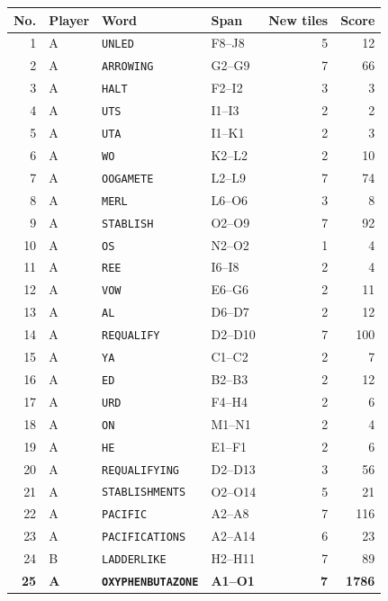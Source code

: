 \documentclass[letterpaper]{article}
\begin{document}
\begin{center}
\fontsize{8}{8.15}\selectfont
\setlength{\tabcolsep}{4pt}
\renewcommand{\arraystretch}{0.80}
\begin{tabular}{@{}rlllrr@{}}\toprule
No. & Player & Word & Span & New tiles & Score\\
\midrule
1 & A & \texttt{UNLED} & F8--J8 & 5 & 12\\
2 & A & \texttt{ARROWING} & G2--G9 & 7 & 66\\
3 & A & \texttt{HALT} & F2--I2 & 3 & 3\\
4 & A & \texttt{UTS} & I1--I3 & 2 & 2\\
5 & A & \texttt{UTA} & I1--K1 & 2 & 3\\
6 & A & \texttt{WO} & K2--L2 & 2 & 10\\
7 & A & \texttt{OOGAMETE} & L2--L9 & 7 & 74\\
8 & A & \texttt{MERL} & L6--O6 & 3 & 8\\
9 & A & \texttt{STABLISH} & O2--O9 & 7 & 92\\
10 & A & \texttt{OS} & N2--O2 & 1 & 4\\
11 & A & \texttt{REE} & I6--I8 & 2 & 4\\
12 & A & \texttt{VOW} & E6--G6 & 2 & 11\\
13 & A & \texttt{AL} & D6--D7 & 2 & 12\\
14 & A & \texttt{REQUALIFY} & D2--D10 & 7 & 100\\
15 & A & \texttt{YA} & C1--C2 & 2 & 7\\
16 & A & \texttt{ED} & B2--B3 & 2 & 12\\
17 & A & \texttt{URD} & F4--H4 & 2 & 6\\
18 & A & \texttt{ON} & M1--N1 & 2 & 4\\
19 & A & \texttt{HE} & E1--F1 & 2 & 6\\
20 & A & \texttt{REQUALIFYING} & D2--D13 & 3 & 56\\
21 & A & \texttt{STABLISHMENTS} & O2--O14 & 5 & 21\\
22 & A & \texttt{PACIFIC} & A2--A8 & 7 & 116\\
23 & A & \texttt{PACIFICATIONS} & A2--A14 & 6 & 23\\
24 & B & \texttt{LADDERLIKE} & H2--H11 & 7 & 89\\
\midrule
\textbf{25} & \textbf{A} & \textbf{\texttt{OXYPHENBUTAZONE}} & \textbf{A1--O1} & \textbf{7} & \textbf{1786}\\
\bottomrule\end{tabular}
\end{center}
\end{document}
